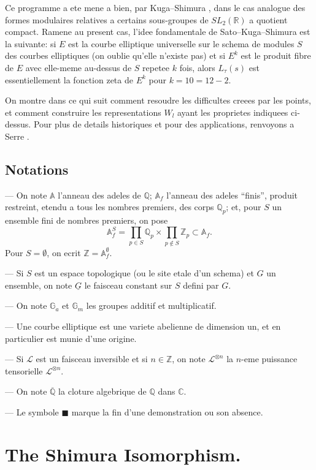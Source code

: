\documentclass[11pt,reqno]{amsart}
\theoremstyle{plain}
\theoremstyle{remark}
\newcommand{\Z}{\mathbb{Z}}
\newcommand{\Q}{\mathbb{Q}}
\newcommand{\R}{\mathbb{R}}
\newcommand{\C}{\mathbb{C}}
\newcommand{\A}{\mathbb{A}}
\newcommand{\Gm}{\mathbb{G}_m}
\newcommand{\Ga}{\mathbb{G}_a}
\numberwithin{equation}{section}
\begin{document}
Ce programme a ete mene a bien, par Kuga--Shimura \cite{KugaShimura}, dans le cas analogue des formes modulaires relatives a certains sous-groupes de $SL_2(\R)$ a quotient compact. Ramene au present cas, l'idee fondamentale de Sato--Kuga--Shimura est la suivante: si $E$ est la courbe elliptique universelle sur le schema de modules $S$ des courbes elliptiques (on oublie qu'elle n'existe pas) et si $E^k$ est le produit fibre de $E$ avec elle-meme au-dessus de $S$ repetee $k$ fois, alors $L_\tau(s)$ est essentiellement la fonction zeta de $E^k$ pour $k = 10 = 12-2$.

On montre dans ce qui suit comment resoudre les difficultes creees par les points, et comment construire les representations $W_l$ ayant les proprietes indiquees ci-dessus. Pour plus de details historiques et pour des applications, renvoyons a Serre \cite{Serre}.

\subsection*{Notations}

--- On note $\A$ l'anneau des adeles de $\Q$; $\A_f$ l'anneau des adeles ``finis'', produit restreint, etendu a tous les nombres premiers, des corps $\Q_p$; et, pour $S$ un ensemble fini de nombres premiers, on pose
\[
\A_f^S = \prod_{p \in S} \Q_p \times \prod_{p \not\in S} \Z_p \subset \A_f.
\]
Pour $S = \emptyset$, on ecrit $\Z = \A_f^{\emptyset}$.

--- Si $S$ est un espace topologique (ou le site etale d'un schema) et $G$ un ensemble, on note $\underline{G}$ le faisceau constant sur $S$ defini par $G$.

--- On note $\Ga$ et $\Gm$ les groupes additif et multiplicatif.

--- Une courbe elliptique est une variete abelienne de dimension un, et en particulier est munie d'une origine.

--- Si $\mathcal{L}$ est un faisceau inversible et si $n \in \Z$, on note $\mathcal{L}^{\otimes n}$ la $n$-eme puissance tensorielle $\mathcal{L}^{\otimes n}$.

--- On note $\overline{\Q}$ la cloture algebrique de $\Q$ dans $\C$.

--- Le symbole $\blacksquare$ marque la fin d'une demonstration ou son absence.

\section{The Shimura Isomorphism.}\label{sec:2}
\end{document}

